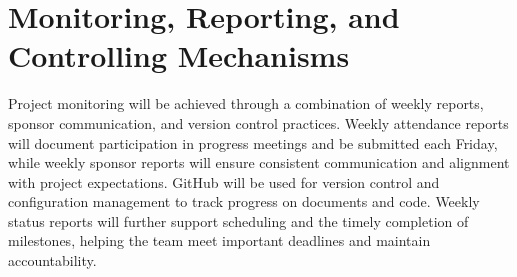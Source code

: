 \section{Monitoring, Reporting, and Controlling Mechanisms}

Project monitoring will be achieved through a combination of weekly reports, sponsor communication, and version control practices. Weekly attendance reports will document participation in progress meetings and be submitted each Friday, while weekly sponsor reports will ensure consistent communication and alignment with project expectations. GitHub will be used for version control and configuration management to track progress on documents and code. Weekly status reports will further support scheduling and the timely completion of milestones, helping the team meet important deadlines and maintain accountability.